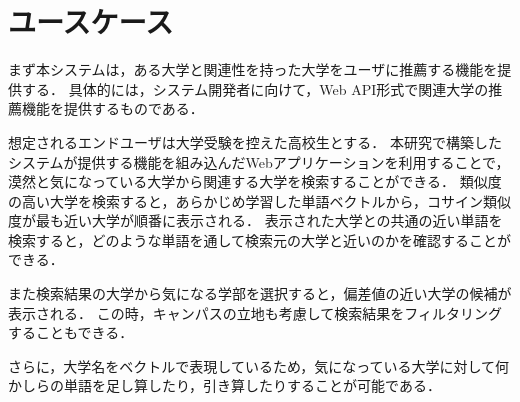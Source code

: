 \section{ユースケース}
まず本システムは，ある大学と関連性を持った大学をユーザに推薦する機能を提供する．
具体的には，システム開発者に向けて，Web API形式で関連大学の推薦機能を提供するものである．

想定されるエンドユーザは大学受験を控えた高校生とする．
本研究で構築したシステムが提供する機能を組み込んだWebアプリケーションを利用することで，漠然と気になっている大学から関連する大学を検索することができる．
類似度の高い大学を検索すると，あらかじめ学習した単語ベクトルから，コサイン類似度が最も近い大学が順番に表示される．
表示された大学との共通の近い単語を検索すると，どのような単語を通して検索元の大学と近いのかを確認することができる．

また検索結果の大学から気になる学部を選択すると，偏差値の近い大学の候補が表示される．
この時，キャンパスの立地も考慮して検索結果をフィルタリングすることもできる．

さらに，大学名をベクトルで表現しているため，気になっている大学に対して何かしらの単語を足し算したり，引き算したりすることが可能である．

